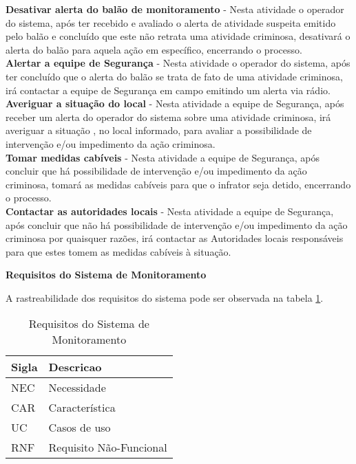 \textbf{Desativar alerta do balão de monitoramento} - Nesta atividade o operador do sistema, após ter recebido e avaliado o alerta de atividade suspeita emitido pelo balão e concluído que este não retrata uma atividade criminosa, desativará o alerta do balão para aquela ação em específico, encerrando o processo.
\\

\textbf{Alertar a equipe de Segurança} - Nesta atividade o operador do sistema, após ter concluído que o alerta do balão se trata de fato de uma atividade criminosa, irá contactar a equipe de Segurança em campo emitindo um alerta via rádio.
\\

\textbf{Averiguar a situação do local} - Nesta atividade a equipe de Segurança, após receber um alerta do operador do sistema sobre uma atividade criminosa, irá averiguar a situação , no local informado, para avaliar a possibilidade de intervenção e/ou impedimento da ação criminosa.
\\

\textbf{Tomar medidas cabíveis} - Nesta atividade a equipe de Segurança, após concluir que há possibilidade de intervenção e/ou impedimento da ação criminosa, tomará as medidas cabíveis para que o infrator seja detido, encerrando o processo.
\\

\textbf{Contactar as autoridades locais} - Nesta atividade a equipe de Segurança, após concluir que não há possibilidade de intervenção e/ou impedimento da ação criminosa por quaisquer razões, irá contactar as Autoridades locais responsáveis para que estes tomem as medidas cabíveis à situação.
\\
\par
\textbf{Requisitos do Sistema de Monitoramento}

A rastreabilidade dos requisitos do sistema pode ser observada na tabela \ref{tab:Requisitos do Sistema de Monitoramento}.

\begin{table}[H]
\centering
\caption{Requisitos do Sistema de Monitoramento}
\begin{tabular}{|l|l|}
\hline
\textbf{Sigla}        & \textbf{Descricao} \\ \hline
NEC     & Necessidade                      \\ \hline
CAR   	& Característica				   \\ \hline
UC  	& Casos de uso                     \\ \hline
RNF 	& Requisito Não-Funcional          \\ \hline

\end{tabular}
\label{tab:Requisitos do Sistema de Monitoramento}
\end{table}

